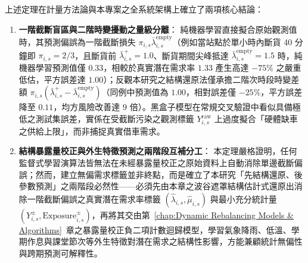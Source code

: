 上述定理在計量方法論與本專案之全系統架構上確立了兩項核心結論：
\begin{enumerate}
    \item \textbf{一階截斷盲區與二階時變擾動之量級分離}：
    純機器學習直接擬合原始觀測值時，其預測偏誤為一階截斷損失 $\pi_{i,s}\bar{\lambda}^{\text{empty}}_{i,s}$（例如當站點於單小時內斷貨 40 分鐘即 $\pi_{i,s} = 2/3$，且斷貨前 $\bar{\lambda}^+_{i,s} = 1.0$、斷貨期間尖峰抵達 $\bar{\lambda}^{\text{empty}}_{i,s} = 1.5$ 時，純機器學習預測值僅 $0.33$，相較於真實潛在需求率 $1.33$ 產生高達 $-75\%$ 之嚴重低估，平方誤差達 $1.00$）；反觀本研究之結構還原法僅承擔二階次時段時變差額 $\pi_{i,s}(\bar{\lambda}^+_{i,s} - \bar{\lambda}^{\text{empty}}_{i,s})$（同例中預測值為 $1.00$，相對誤差僅 $-25\%$，平方誤差降至 $0.11$，均方風險改善達 $9$ 倍）。黑盒子模型在常規交叉驗證中看似具備極低之測試集誤差，實係在受截斷污染之觀測標籤 $Y^{\text{raw}}_{i,s}$ 上過度擬合「硬體缺車之供給上限」，而非捕捉真實借車需求。

    \item \textbf{結構暴露量校正與外生特徵預測之兩階段互補分工}：
    本定理嚴格證明，任何監督式學習演算法皆無法在未經暴露量校正之原始資料上自動消除單邊截斷偏誤；然而，建立無偏需求標籤並非終點，而是確立了本研究「先結構還原、後參數預測」之兩階段必然性——必須先由本章之波谷遮罩結構估計式還原出消除一階截斷偏誤之真實潛在需求率標籤 $\left(\hat{\lambda}_{i,s}, \hat{\mu}_{i,s}\right)$ 與最小充分統計量 $\left(Y^{\pm}_{i,s}, \text{Exposure}^{\pm}_{i,s}\right)$，再將其交由第~\ref{chap:Dynamic Rebalancing Models & Algorithms}~章之暴露量校正負二項計數迴歸模型，學習氣象降雨、低溫、學期作息與課堂節次等外生特徵對潛在需求之結構性影響，方能兼顧統計無偏性與跨期預測可解釋性。
\end{enumerate}
